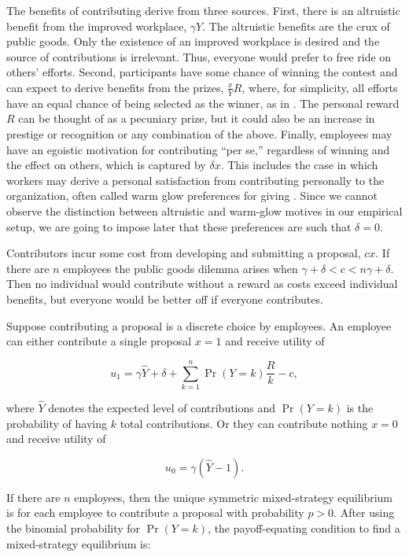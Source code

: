 \documentclass[12pt, titlepage]{article}
\begin{document}
The benefits of contributing derive from three sources. First, there is
an altruistic benefit from the improved workplace, \(\gamma Y\). The
altruistic benefits are the crux of public goods. Only the existence of
an improved workplace is desired and the source of contributions is
irrelevant. Thus, everyone would prefer to free ride on others' efforts.
Second, participants have some chance of winning the contest and can
expect to derive benefits from the prizes, \(\frac{x}{Y} R\), where, for
simplicity, all efforts have an equal chance of being selected as the
winner, as in \citet{morgan2000financing}. The personal reward \(R\) can
be thought of as a pecuniary prize, but it could also be an increase in
prestige or recognition or any combination of the above. Finally,
employees may have an egoistic motivation for contributing ``per se,''
regardless of winning and the effect on others, which is captured by
\(\delta x\). This includes the case in which workers may derive a
personal satisfaction from contributing personally to the organization,
often called warm glow preferences for giving \citep{andreoni1995warm}.
Since we cannot observe the distinction between altruistic and warm-glow
motives in our empirical setup, we are going to impose later that these
preferences are such that \(\delta=0\).

Contributors incur some cost from developing and submitting a proposal,
\(c x\). If there are \(n\) employees the public goods dilemma arises
when \(\gamma+\delta < c < n\gamma+\delta\). Then no individual would
contribute without a reward as costs exceed individual benefits, but
everyone would be better off if everyone contributes.

Suppose contributing a proposal is a discrete choice by employees. An
employee can either contribute a single proposal \(x=1\) and receive
utility of

\begin{equation}
    u_1 = \gamma \hat Y + \delta + \sum_{k=1}^{n}\Pr(Y=k)\frac{R}{k}  - c, 
\end{equation}

where \(\hat Y\) denotes the expected level of contributions and
\(\Pr(Y=k)\) is the probability of having \(k\) total contributions. Or
they can contribute nothing \(x=0\) and receive utility of

\begin{equation}
  u_0 = \gamma (\hat Y - 1).
\end{equation}

If there are \(n\) employees, then the unique symmetric mixed-strategy
equilibrium is for each employee to contribute a proposal with
probability \(p>0\). After using the binomial probability for
\(\Pr(Y=k)\), the payoff-equating condition to find a mixed-strategy
equilibrium is:
\end{document}
